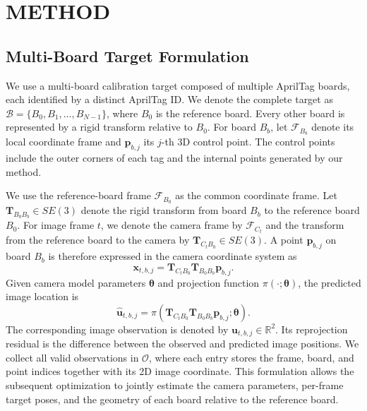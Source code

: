 \documentclass[letterpaper, 10 pt, conference]{ieeeconf}  %
\begin{document}
\section{METHOD}

\subsection{Multi-Board Target Formulation}

We use a multi-board calibration target composed of multiple AprilTag boards,
each identified by a distinct AprilTag ID. We denote the complete target as
$\mathcal{B}=\{B_0,B_1,\ldots,B_{N-1}\}$, where $B_0$ is the reference
board. Every other board is represented by a rigid transform relative to
$B_0$. For board $B_b$, let $\mathcal{F}_{B_b}$ denote its local coordinate
frame and $\mathbf{p}_{b,j}$ its $j$-th 3D control point. The control points
include the outer corners of each tag and the internal points generated by our
method.

We use the reference-board frame $\mathcal{F}_{B_0}$ as the common coordinate
frame. Let $\mathbf{T}_{B_0B_b}\in SE(3)$ denote the rigid transform from
board $B_b$ to the reference board $B_0$. For image frame $t$, we denote the
camera frame by $\mathcal{F}_{C_t}$ and the transform from the reference board
to the camera by $\mathbf{T}_{C_tB_0}\in SE(3)$. A point $\mathbf{p}_{b,j}$
on board $B_b$ is therefore expressed in the camera coordinate system as
\begin{equation}
\mathbf{x}_{t,b,j}
=
\mathbf{T}_{C_tB_0}\mathbf{T}_{B_0B_b}\mathbf{p}_{b,j}.
\label{eq:multiboard_point}
\end{equation}
Given camera model parameters $\boldsymbol{\theta}$ and projection function
$\pi(\cdot;\boldsymbol{\theta})$, the predicted image location is
\begin{equation}
\hat{\mathbf{u}}_{t,b,j}
=
\pi\!\left(
\mathbf{T}_{C_tB_0}\mathbf{T}_{B_0B_b}\mathbf{p}_{b,j};
\boldsymbol{\theta}
\right).
\label{eq:multiboard_projection}
\end{equation}
The corresponding image observation is denoted by
$\mathbf{u}_{t,b,j}\in\mathbb{R}^{2}$. Its reprojection residual is the
difference between the observed and predicted image positions. We collect all
valid observations in $\mathcal{O}$, where each entry stores the frame, board,
and point indices together with its 2D image coordinate. This formulation
allows the subsequent optimization to jointly estimate the camera parameters,
per-frame target poses, and the geometry of each board relative to the
reference board.
\end{document}

